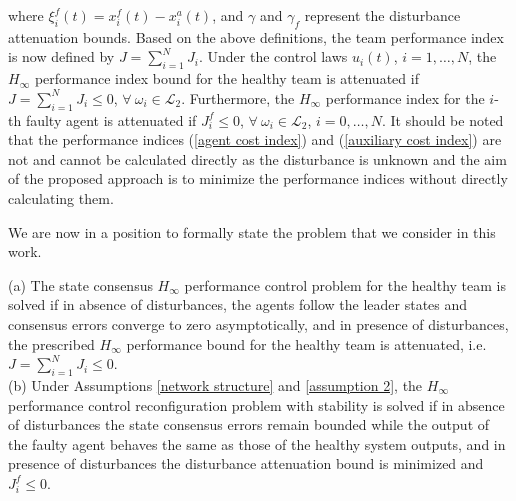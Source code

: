 \documentclass[12pt,draftcls,onecolumn]{IEEEtran}
\begin{document}
 where 
$  \xi_i^f(t)=x_i^f(t)-x_i^a(t)$, 
 and $\gamma$ and $\gamma_f$ represent the disturbance attenuation bounds. Based on the above definitions, the team performance index is now defined by $J=\sum_{i=1}^NJ_i$. Under the control laws $u_i(t)$, $i=1,\dots,N$, the $H_{\infty}$ performance index bound for the healthy team is attenuated if $J=\sum_{i=1}^NJ_i\leq 0$, $\forall\ \omega_i\in \mathcal{L}_2$.  Furthermore, the $H_{\infty}$ performance index for the $i$-th faulty agent is attenuated if $J_i^f\leq 0$, $\forall\ \omega_i\in \mathcal{L}_2$, $i=0,\dots,N$. {It should be noted that
 the performance indices (\ref{agent cost index}) and (\ref{auxiliary cost index}) are not and cannot be calculated directly as the disturbance is unknown and the aim of the proposed approach is to minimize the performance indices without directly calculating them.}
 
We are now in a position to formally state  the problem that we consider in this work.
 \begin{definitions}\label{def. 1}
 (a) The   state consensus $H_{\infty}$ performance control problem for the  healthy  team is solved if in  absence of  disturbances, the agents   follow the leader states and consensus errors converge to zero asymptotically, and in  presence of disturbances, the prescribed  $H_{\infty}$ performance bound for the healthy team is attenuated, i.e. $J=\sum_{i=1}^NJ_i\leq 0$.\\ 
 (b) Under Assumptions \ref{network structure} and \ref{assumption 2}, the $H_{\infty}$ performance  control reconfiguration problem with stability is solved if in absence of  disturbances the state consensus errors remain bounded  
 while the output of the faulty agent behaves the same as those of the healthy system outputs, and in presence of disturbances the disturbance attenuation bound is minimized and $J_i^f\leq 0$.
 \end{definitions}
\end{document}
